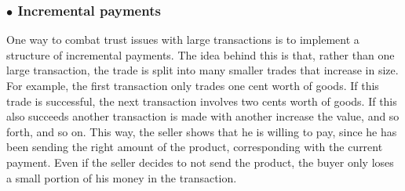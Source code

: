 \subsubsection*{$\bullet$ Incremental payments}
One way to combat trust issues with large transactions is to implement a structure of incremental payments.
The idea behind this is that, rather than one large transaction, the trade is split into many smaller trades that increase in size.
For example, the first transaction only trades one cent worth of goods. If this trade is successful, the next transaction involves two cents worth of goods. If this also succeeds another transaction is made with another increase the value, and so forth, and so on.
This way, the seller shows that he is willing to pay, since he has been sending the right amount of the product, corresponding with the current payment.
Even if the seller decides to not send the product, the buyer only loses a small portion of his money in the transaction.